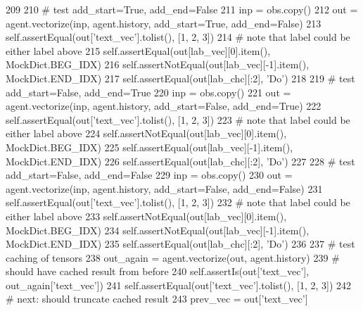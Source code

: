 \begin{DoxyCode}
209 
210             \textcolor{comment}{# test add\_start=True, add\_end=False}
211             inp = obs.copy()
212             out = agent.vectorize(inp, agent.history, add\_start=\textcolor{keyword}{True}, add\_end=\textcolor{keyword}{False})
213             self.assertEqual(out[\textcolor{stringliteral}{'text\_vec'}].tolist(), [1, 2, 3])
214             \textcolor{comment}{# note that label could be either label above}
215             self.assertEqual(out[lab\_vec][0].item(), MockDict.BEG\_IDX)
216             self.assertNotEqual(out[lab\_vec][-1].item(), MockDict.END\_IDX)
217             self.assertEqual(out[lab\_chc][:2], \textcolor{stringliteral}{'Do'})
218 
219             \textcolor{comment}{# test add\_start=False, add\_end=True}
220             inp = obs.copy()
221             out = agent.vectorize(inp, agent.history, add\_start=\textcolor{keyword}{False}, add\_end=\textcolor{keyword}{True})
222             self.assertEqual(out[\textcolor{stringliteral}{'text\_vec'}].tolist(), [1, 2, 3])
223             \textcolor{comment}{# note that label could be either label above}
224             self.assertNotEqual(out[lab\_vec][0].item(), MockDict.BEG\_IDX)
225             self.assertEqual(out[lab\_vec][-1].item(), MockDict.END\_IDX)
226             self.assertEqual(out[lab\_chc][:2], \textcolor{stringliteral}{'Do'})
227 
228             \textcolor{comment}{# test add\_start=False, add\_end=False}
229             inp = obs.copy()
230             out = agent.vectorize(inp, agent.history, add\_start=\textcolor{keyword}{False}, add\_end=\textcolor{keyword}{False})
231             self.assertEqual(out[\textcolor{stringliteral}{'text\_vec'}].tolist(), [1, 2, 3])
232             \textcolor{comment}{# note that label could be either label above}
233             self.assertNotEqual(out[lab\_vec][0].item(), MockDict.BEG\_IDX)
234             self.assertNotEqual(out[lab\_vec][-1].item(), MockDict.END\_IDX)
235             self.assertEqual(out[lab\_chc][:2], \textcolor{stringliteral}{'Do'})
236 
237             \textcolor{comment}{# test caching of tensors}
238             out\_again = agent.vectorize(out, agent.history)
239             \textcolor{comment}{# should have cached result from before}
240             self.assertIs(out[\textcolor{stringliteral}{'text\_vec'}], out\_again[\textcolor{stringliteral}{'text\_vec'}])
241             self.assertEqual(out[\textcolor{stringliteral}{'text\_vec'}].tolist(), [1, 2, 3])
242             \textcolor{comment}{# next: should truncate cached result}
243             prev\_vec = out[\textcolor{stringliteral}{'text\_vec'}]

\end{DoxyCode}
